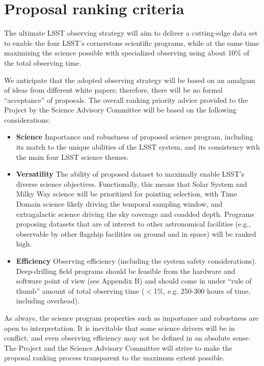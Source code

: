 \documentclass[DM,lsstdraft,toc,usenatbib]{lsstdoc}
\begin{document}
\section{Proposal ranking criteria} 

The ultimate LSST observing strategy will aim to deliver a cutting-edge data set to enable
the four LSST's cornerstone scientific programs, while at the same time maximizing the 
science possible with specialized observing using about 10\% of the total observing time. 

We anticipate that the adopted observing strategy will be based on an amalgam of ideas from 
different white papers; therefore, there will be no formal ``acceptance'' of proposals. The
overall ranking priority advice provided to the Project by the Science Advisory Committee 
will be based on the following considerations: 
\begin{itemize}
\item {\bf Science} Importance and robustness of proposed science program, including 
           its match to the unique abilities of the LSST system, and its consistency with the 
           main four LSST science themes. 
\item {\bf Versatility} The ability of proposed dataset to maximally enable LSST’s diverse science objectives. 
          Functionally, this means that Solar System and Milky Way science will be prioritized for pointing selection,
          with Time Domain science likely driving the temporal sampling window, and extragalactic science driving 
          the sky coverage and coadded depth. Programs proposing datasets that are of interest to other astronomical 
          facilities (e.g., observable by other flagship facilities on ground and in space) will be ranked high. 
\item {\bf Efficiency} Observing efficiency (including the system safety considerations).  Deep-drilling field 
          programs should be feasible from the hardware and software point of view (see Appendix B) and should 
          come in under ``rule of thumb'' amount of total observing time ($<$1\%, e.g. 250-300 hours of time,
          including overhead). 
\end{itemize} 

As always, the science program properties such as importance and robustness are open
to interpretation. It is inevitable that some science drivers will be in conflict, and even
observing efficiency may not be defined in an absolute sense. The Project and the Science Advisory 
Committee will strive to make the proposal ranking process transparent to the maximum extent possible. 
\end{document}
